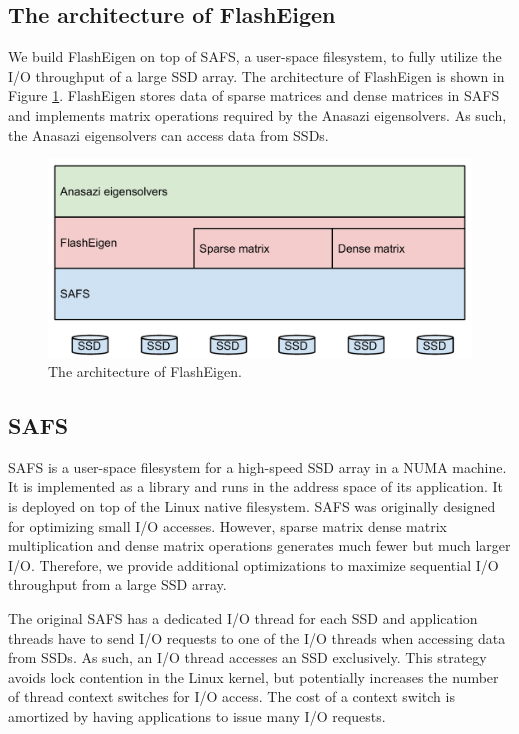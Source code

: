 \subsection{The architecture of FlashEigen}

We build FlashEigen on top of SAFS, a user-space filesystem, to fully utilize
the I/O throughput of a large SSD array. The architecture of FlashEigen is shown
in Figure \ref{arch}. FlashEigen stores data of sparse matrices and dense matrices
in SAFS and implements matrix operations required by the Anasazi eigensolvers.
As such, the Anasazi eigensolvers can access data from SSDs.

\begin{figure}
\centering
\includegraphics[scale=0.4]{./architecture.pdf}
\vspace{-5pt}
\caption{The architecture of FlashEigen.}
\vspace{-5pt}
\label{arch}
\end{figure}

\subsection{SAFS}

SAFS \cite{safs} is a user-space filesystem for a high-speed SSD array in
a NUMA machine. It is implemented as a library and runs in the address space
of its application. It is deployed on top of the Linux native filesystem.
SAFS was originally designed for optimizing small I/O accesses. However,
sparse matrix dense matrix multiplication and dense matrix operations
generates much fewer but much larger I/O. Therefore, we provide additional
optimizations to maximize sequential I/O throughput from a large SSD array.

The original SAFS has a dedicated I/O thread for each SSD and application threads
have to send I/O requests to one of the I/O threads when accessing data from SSDs.
As such, an I/O thread accesses an SSD exclusively. This strategy avoids lock
contention in the Linux kernel, but potentially increases the number of thread
context switches for I/O access. The cost of a context switch is amortized by
having applications to issue many I/O requests.

